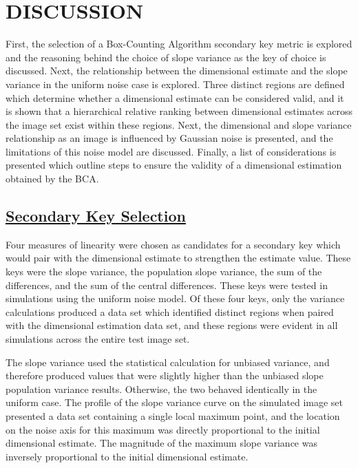 \documentclass[12pt, oneside]{book}
\begin{document}
% 
%
\chapter{\textbf{DISCUSSION}}
First, the selection of a Box-Counting Algorithm secondary key metric is explored and the reasoning behind the choice of slope variance as the key of choice is discussed.  Next, the relationship between the dimensional estimate and the slope variance in the uniform noise case is explored.  Three distinct regions are defined which determine whether a dimensional estimate can be considered valid, and it is shown that a hierarchical relative ranking between dimensional estimates across the image set exist within these regions.  Next, the dimensional and slope variance relationship as an image is influenced by Gaussian noise is presented, and the limitations of this noise model are discussed.  Finally, a list of considerations is presented which outline steps to ensure the validity of a dimensional estimation obtained by the BCA.

\section{\underline{Secondary Key Selection}}
Four measures of linearity were chosen as candidates for a secondary key which would pair with the dimensional estimate to strengthen the estimate value.  These keys were the slope variance, the population slope variance, the sum of the differences, and the sum of the central differences.  These keys were tested in simulations using the uniform noise model.  Of these four keys, only the variance calculations produced a data set which identified distinct regions when paired with the dimensional estimation data set, and these regions were evident in all simulations across the entire test image set.

The slope variance used the statistical calculation for unbiased variance, and therefore produced values that were slightly higher than the unbiased slope population variance results.  Otherwise, the two behaved identically in the uniform case.  The profile of the slope variance curve on the simulated image set presented a data set containing a single local maximum point, and the location on the noise axis for this maximum was directly proportional to the initial dimensional estimate.  The magnitude of the maximum slope variance was inversely proportional to the initial dimensional estimate.  
\end{document}
